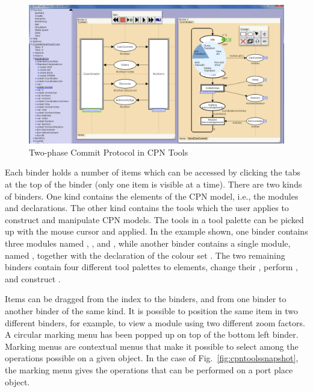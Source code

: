 \begin{figure}[b]
\centering
\includegraphics[width=\textwidth]{figures/cpntools.png}
\caption{Two-phase Commit Protocol in CPN Tools}
\label{fig:cpntools}
\end{figure}

Each binder holds a number of items which can be accessed by clicking
the tabs at the top of the binder (only one item is visible at a
time). There are two kinds of binders. One kind contains the elements
of the CPN model, i.e., the modules and declarations. The other kind
contains the tools which the user applies to construct and manipulate
CPN models. The tools in a tool palette can be picked up with the
mouse cursor and applied. In the example shown, one binder contains
three modules named , , and
, while another binder contains a single module,
named , together with the declaration of the colour
set . The two remaining binders contain four
different tool palettes to  elements, change their
, perform , and construct
.

Items can be dragged from the index to the binders, and from one
binder to another binder of the same kind. It is possible to position
the same item in two different binders, for example, to view a module
using two different zoom factors. A circular marking menu has been
popped up on top of the bottom left binder. Marking menus are
contextual menus that make it possible to select among the operations
possible on a given object. In the case of
Fig.~\ref{fig:cpntoolssnapshot}, the marking menu gives the operations
that can be performed on a port place object.


